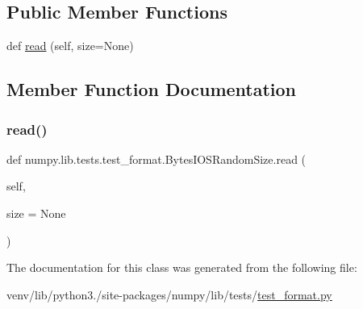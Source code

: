 \subsection*{Public Member Functions}
\begin{DoxyCompactItemize}
\item 
def \hyperlink{classnumpy_1_1lib_1_1tests_1_1test__format_1_1BytesIOSRandomSize_af1de7a5e9bf7993d8369f0ff14c6ec83}{read} (self, size=None)
\end{DoxyCompactItemize}


\subsection{Member Function Documentation}
\mbox{\label{classnumpy_1_1lib_1_1tests_1_1test__format_1_1BytesIOSRandomSize_af1de7a5e9bf7993d8369f0ff14c6ec83}} 
\subsubsection{\texorpdfstring{read()}{read()}}
{\footnotesize\ttfamily def numpy.\+lib.\+tests.\+test\+\_\+format.\+Bytes\+I\+O\+S\+Random\+Size.\+read (\begin{DoxyParamCaption}\item[{}]{self,  }\item[{}]{size = {\ttfamily None} }\end{DoxyParamCaption})}



The documentation for this class was generated from the following file\+:\begin{DoxyCompactItemize}
\item 
venv/lib/python3./site-\/packages/numpy/lib/tests/\hyperlink{test__format_8py}{test\+\_\+format.\+py}\end{DoxyCompactItemize}
